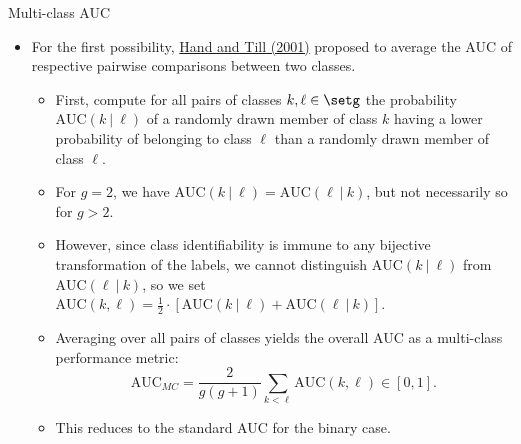 \documentclass[11pt,compress,t,notes=noshow, xcolor=table]{beamer}
\begin{document}
\begin{vbframe}{Multi-class AUC}
\framebreak
  
\begin{itemize}  
  \small
  \item For the first possibility, 
  \href{https://link.springer.com/article/10.1023/A:1010920819831}
  {Hand and Till (2001)} proposed to average the AUC of respective pairwise 
  comparisons between two classes.
  \begin{itemize}
    \small
    \item First, compute for all pairs of classes $k, \ell \in \setg$ the 
    probability $\text{AUC}(k ~|~ \ell)$ of a randomly drawn member of class $k$ 
    having a lower probability of belonging to class $\ell$ than a randomly drawn 
    member of class $\ell$.
    \item For $g = 2$, we have $\text{AUC}(k ~|~ \ell) = 
    \text{AUC}(\ell ~|~ k)$, but not necessarily so for $g > 2$.
    \item However, since class identifiability is immune to any bijective 
    transformation of the labels, we cannot distinguish $\text{AUC}(k ~|~ \ell)$ 
    from $\text{AUC}(\ell ~|~ k)$, so we set 
    $\text{AUC}(k, \ell) = \frac{1}{2} \cdot [\text{AUC}(k ~|~ \ell) + 
    \text{AUC}(\ell ~|~ k)]$.
  
  
    \item Averaging over all pairs of classes yields the overall AUC as a 
    multi-class performance metric:
    $$\text{AUC}_{MC} = \frac{2}{g(g + 1)} \sum_{k < \ell} \text{AUC}(k, \ell) 
    \in [0, 1].$$
    \item This reduces to the standard AUC for the binary case.
  \end{itemize}
\end{itemize}
\end{vbframe}


\endlecture
\end{document}
